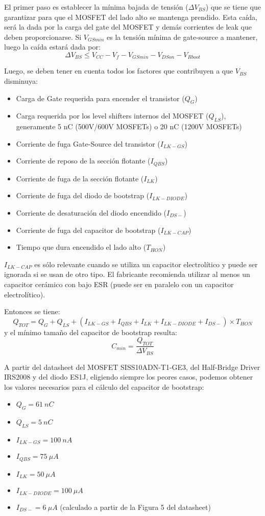 \documentclass[titlepage, 12pt]{article}
\begin{document}
El primer paso es establecer la mínima bajada de tensión ($\Delta V_{BS}$) que se tiene que garantizar para que el MOSFET del lado alto se mantenga prendido. Esta caída, será la dada por la carga del gate del MOSFET y demás corrientes de leak que deben proporcionarse. Si $V_{GS min}$ es la tensión mínima de gate-source a mantener, luego la caída estará dada por:
\[
    \Delta V_{BS} \leq V_{CC} - V_f - V_{GS min} - V_{DS on} - V_{Rboot}
\]

Luego, se deben tener en cuenta todos los factores que contribuyen a que $V_{BS}$ disminuya:
\begin{itemize}
    \item Carga de Gate requerida para encender el transistor ($Q_G$)
    \item Carga requerida por los level shifters internos del MOSFET ($Q_{LS}$), generamente 5 nC (500V/600V MOSFETs) o 20 nC (1200V MOSFETs)
    \item Corriente de fuga Gate-Source del transistor ($I_{LK-GS}$)
    \item Corriente de reposo de la sección flotante ($I_{QBS}$)
    \item Corriente de fuga de la sección flotante ($I_{LK}$)
    \item Corriente de fuga del diodo de bootstrap ($I_{LK-DIODE}$)
    \item Corriente de desaturación del diodo encendido ($I_{DS-}$)
    \item Corriente de fuga del capacitor de bootstrap ($I_{LK-CAP}$)
    \item Tiempo que dura encendido el lado alto ($T_{HON}$)
\end{itemize}

$I_{LK-CAP}$ es sólo relevante cuando se utiliza un capacitor electrolítico y puede ser ignorada si se usan de otro tipo. El fabricante recomienda utilizar al menos un capacitor cerámico con bajo ESR (puede ser en paralelo con un capacitor electrolítico).

Entonces se tiene:
\[
    Q_{TOT} = Q_G + Q_{LS} + (I_{LK-GS} + I_{QBS} + I_{LK} + I_{LK-DIODE} + I_{DS-}) \times T_{HON}
\]
y el mínimo tamaño del capacitor de bootstrap resulta:
\[
    C_{min} = \frac{Q_{TOT}}{\Delta V_{BS}}
\]

A partir del datasheet del MOSFET SISS10ADN-T1-GE3, del Half-Bridge Driver IRS2008 y del diodo ES1J, eligiendo siempre los peores casos, podemos obtener los valores necesarios para el cálculo del capacitor de bootstrap:
\begin{itemize}
    \item $Q_G = \SI{61}{nC}$ 
    \item $Q_{LS} = \SI{5}{nC}$
    \item $I_{LK-GS} = \SI{100}{nA}$
    \item $I_{QBS} = \SI{75}{\mu A}$
    \item $I_{LK} = \SI{50}{\mu A}$
    \item $I_{LK-DIODE} = \SI{100}{\mu A}$
    \item $I_{DS-} = \SI{6}{\mu A}$ (calculado a partir de la Figura 5 del datasheet)
\end{itemize}
\end{document}
